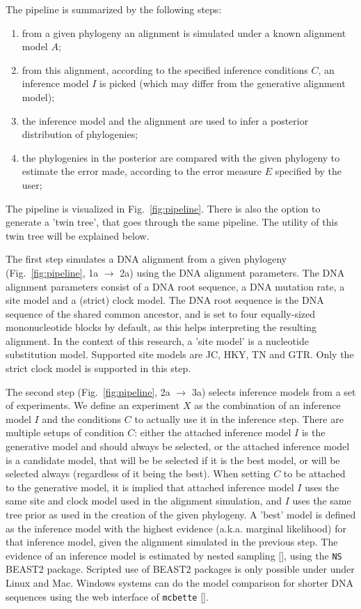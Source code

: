 \documentclass{article}
\begin{document}
The pipeline is summarized by the following steps:
\begin{enumerate}
  \item from a given phylogeny an alignment is simulated 
    under a known alignment model $\mathit{A}$;
  \item from this alignment, according to the specified inference conditions $\mathit{C}$, 
    an inference model $\mathit{I}$ is picked (which may differ from the 
    generative alignment model);
  \item the inference model and the alignment are used 
    to infer a posterior distribution of phylogenies;
  \item the phylogenies in the posterior are compared with the given phylogeny 
    to estimate the error made, according to the error measure $\mathit{E}$ specified 
    by the user;
\end{enumerate}
The pipeline is visualized in Fig.~\ref{fig:pipeline}. 
There is also the option to generate a 'twin tree', 
that goes through the same pipeline. 
The utility of this twin tree will be explained below.

The first step simulates a DNA alignment from a given 
phylogeny (Fig.~\ref{fig:pipeline}, 1a $\rightarrow$ 2a)
using the DNA alignment parameters.
The DNA alignment parameters consist of a DNA root sequence, a DNA mutation rate,
a site model and a (strict) clock model.
The DNA root sequence is the DNA sequence of the shared common ancestor,
and is set to four equally-sized mononucleotide blocks by default, as this
helps interpreting the resulting alignment.
In the context of this research, a 'site model' is a nucleotide substitution
model. Supported site models are JC, HKY, TN and GTR. Only the strict
clock model is supported in this step.

The second step (Fig.~\ref{fig:pipeline}, 2a $\rightarrow$ 3a)
selects inference models from a set of experiments. 
We define an experiment $X$ as the combination of an inference model $I$
and the conditions $C$ to actually use it in the inference step.
There are multiple setups of condition $C$: 
either the attached inference model $I$ is the generative model and should always be selected,
or the attached inference model is a candidate model, that will be
be selected if it is the best model, or will be selected always (regardless
of it being the best). 
When setting $C$ to be attached to the generative model,
it is implied that attached inference model $I$ uses the 
same site and clock model used in the alignment simulation,
and $I$ uses the same tree prior as used in the creation of the given phylogeny. 
A 'best' model is defined as the inference model with
the highest evidence (a.k.a. marginal likelihood) for that inference model, 
given the alignment simulated in the previous step.
The evidence of an inference model is estimated by nested 
sampling [\cite{maturana2018model}], using the \verb;NS; BEAST2 package.
Scripted use of BEAST2 packages is only possible under under Linux and Mac.
Windows systems can do the model comparison for shorter DNA sequences
using the web interface of \verb;mcbette; [\cite{mcbette}].
\end{document}
